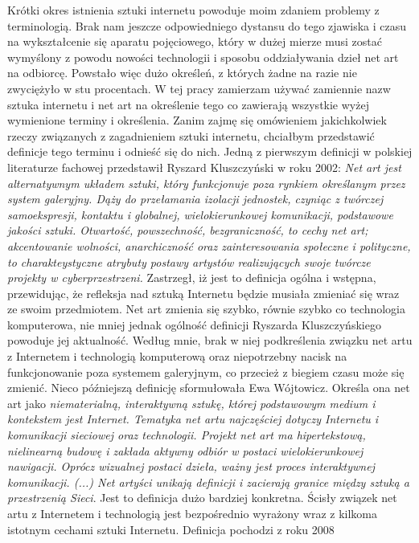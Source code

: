 \documentclass[a4paper,12pt]{article}
\begin{document}
Krótki okres istnienia sztuki internetu powoduje moim zdaniem problemy
z terminologią. Brak nam jeszcze odpowiedniego dystansu do tego zjawiska
i czasu na wykształcenie się aparatu pojęciowego, który w dużej mierze
musi zostać wymyślony z powodu nowości technologii i sposobu oddziaływania
dzieł net art na odbiorcę. Powstało więc dużo określeń, z których żadne
na razie nie zwyciężyło w stu procentach.
W tej pracy zamierzam używać zamiennie nazw sztuka internetu i net art
na określenie tego co zawierają wszystkie wyżej wymienione terminy
i określenia. Zanim zajmę się omówieniem jakichkolwiek rzeczy związanych
z zagadnieniem sztuki internetu, chciałbym przedstawić definicje
tego terminu i odnieść się do nich.
Jedną z pierwszym definicji
w polskiej literaturze fachowej przedstawił Ryszard Kluszczyński w roku 2002:
\textit{Net art jest alternatywnym układem sztuki, który funkcjonuje
poza rynkiem określanym przez system galeryjny. Dąży do przełamania
izolacji jednostek, czyniąc z twórczej samoekspresji, kontaktu i globalnej,
wielokierunkowej komunikacji, podstawowe jakości sztuki. Otwartość,
powszechność, bezgraniczność, to cechy net art; akcentowanie wolności,
anarchiczność oraz zainteresowania społeczne i polityczne, to charakteystyczne
atrybuty postawy artystów realizujących swoje twórcze projekty
w cyberprzestrzeni.}
Zastrzegł, iż jest to definicja ogólna i wstępna, przewidując, że refleksja
nad sztuką Internetu będzie musiała zmieniać się wraz ze swoim przedmiotem.
Net art zmienia się szybko, równie szybko co technologia komputerowa,
nie mniej jednak ogólność definicji Ryszarda Kluszczyńskiego powoduje
jej aktualność. Według mnie, brak w niej podkreślenia związku net artu
z Internetem i technologią komputerową oraz niepotrzebny nacisk na
funkcjonowanie poza systemem galeryjnym, co przecież z biegiem czasu
może się zmienić.
Nieco późniejszą definicję sformułowała Ewa Wójtowicz. Określa ona net art
jako %
\textit{niematerialną, interaktywną sztukę, której podstawowym
medium i kontekstem jest Internet. Tematyka net artu najczęściej dotyczy
Internetu i komunikacji sieciowej oraz technologii. Projekt net art ma
hipertekstową, nielinearną budowę i zakłada aktywny odbiór w postaci
wielokierunkowej nawigacji. Oprócz wizualnej postaci dzieła, ważny jest
proces interaktywnej komunikacji. (...) Net artyści unikają definicji
i zacierają granice między sztuką a przestrzenią Sieci}.
Jest to definicja dużo bardziej konkretna. Ścisły związek net artu
z Internetem i technologią jest bezpośrednio wyrażony wraz z kilkoma
istotnym cechami sztuki Internetu. Definicja pochodzi z roku 2008
\end{document}
